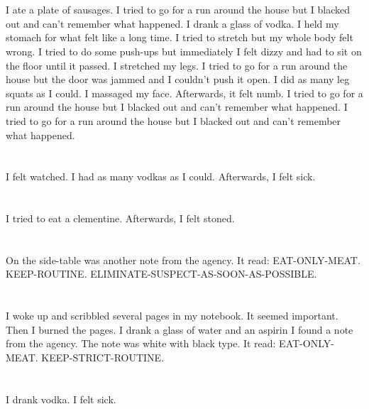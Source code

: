 \documentclass{article}
\begin{document}
    \section{}
    I ate a plate of sausages. I tried to go for a run around the house but I blacked out and can't remember what happened. I drank a glass of vodka. I held my stomach for what felt like a long time.  I tried to stretch but my whole body felt wrong.  I tried to do some push-ups but immediately I felt dizzy and had to sit on the floor until it passed.  I stretched my legs.  I tried to go for a run around the house but the door was jammed and I couldn't push it open.   I did as many leg squats as I could.  I massaged my face. Afterwards, it felt numb.  I tried to go for a run around the house but I blacked out and can't remember what happened.  I tried to go for a run around the house but I blacked out and can't remember what happened.  
    \newpage
    
    \section{}
    I felt watched. I had as many vodkas as I could. Afterwards, I felt sick.  
    \newpage
    
    \section{}
    I tried to eat a clementine. Afterwards, I felt stoned.  
    \newpage
    
    \section{}
    On the side-table was another note from the agency. It read: EAT-ONLY-MEAT. KEEP-ROUTINE. ELIMINATE-SUSPECT-AS-SOON-AS-POSSIBLE.  
    \newpage
    
    \section{}
    I woke up and scribbled several pages in my notebook. It seemed important. Then I burned the pages. I drank a glass of water and an aspirin I found a note from the agency. The note was white with black type. It read: EAT-ONLY-MEAT. KEEP-STRICT-ROUTINE.  
    \newpage
    
    \section{}
    I drank vodka. I felt sick.  
    \newpage
    
\end{document}
